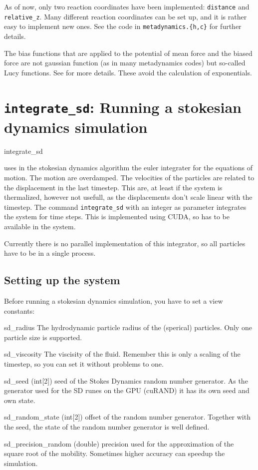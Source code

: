 As of now, only two reaction coordinates have been implemented:
\texttt{distance} and \texttt{relative_z}. Many different reaction
coordinates can be set up, and it is rather easy to implement new
ones. See the code in \texttt{metadynamics.\{h,c\}} for further
details. 

The bias functions that are applied to the potential of mean force and
the biased force are not gaussian function (as in many metadynamics
codes) but so-called Lucy functions. See \cite{marsili09} for more
details. These avoid the calculation of exponentials.

\section{\texttt{integrate_sd}: Running a stokesian dynamics simulation}

\begin{essyntax}
   integrate_sd 
\end{essyntax}

\es uses in the stokesian dynamics algorithm  the euler integrater for the
equations of motion. The motion are overdamped. The velocities of the
particles are related to the displacement in the last timestep. This are, at
least if the system is thermalized, however not usefull, as the displacements
don't scale linear with the timestep. The command \texttt{integrate_sd} with
an integer  as parameter integrates the system for
 time steps. This is implemented using CUDA, so 
has to be available in the system.

Currently there is no parallel implementation of this integrator, so all
particles have to be in a single process.

\subsection{Setting up the system}
Before running a stokesian dynamics simulation, you have to set a view
constants:
\begin{globvar}
\item[sd_radius] The hydrodynamic particle radius of the (sperical)
  particles. Only one particle size is supported.
\item[sd_viscosity] The viscisity of the fluid. Remember this is only a
  scaling of the timestep, so you can set it without problems to one.
\item[sd_seed] (int[2]) seed of the Stokes Dynamics random number generator.
  As the generator used for the SD runes on the GPU (cuRAND) it has its own
  seed and own state.
\item[sd_random_state] (int[2]) offset of the random number
  generator. Together with the seed, the state of the random number generator
  is well defined.
\item[sd_precision_random] (double) precision used for the approximation of
  the square root of the mobility. Sometimes higher accuracy can speedup the
  simulation.
\end{globvar}

